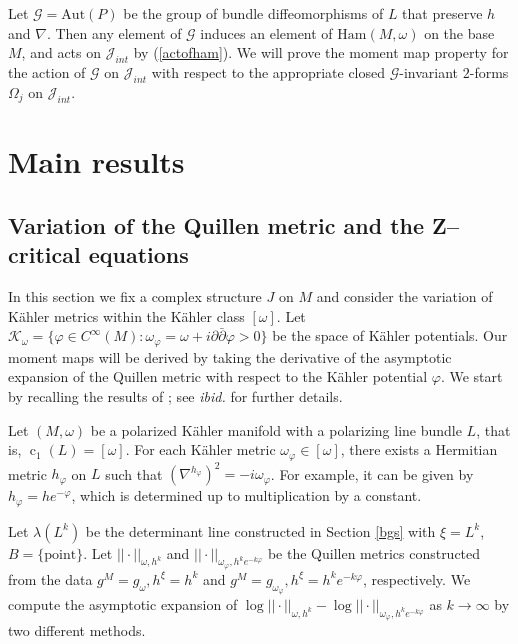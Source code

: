 \documentclass[12pt,reqno,a4paper]{amsart}
\numberwithin{equation}{section}
\DeclareMathOperator{\cc}{c}
\theoremstyle{definition}
\theoremstyle{remark}
\begin{document}
Let $\mathcal{G}=\mathrm{Aut}(P)$ be the group of bundle diffeomorphisms of $L$ that preserve $h$ and $\nabla$. Then any element of $\mathcal{G}$ induces an element of $\mathrm{Ham}(M,\omega)$ on the base $M$, and acts on $\mathcal{J}_{int}$ by (\ref{actofham}). We will prove the moment map property for the action of $\mathcal{G}$ on $\mathcal{J}_{int}$ with respect to the appropriate closed $\mathcal{G}$-invariant $2$-forms $\Omega_j$ on $\mathcal{J}_{int}$. 


\section{Main results}

\subsection{Variation of the Quillen metric and the Z--critical equations}\label{Zcrit}

In this section we fix a complex structure $J$ on $M$ and consider the variation of K\"ahler metrics within the K\"ahler class $[\omega]$. Let $\mathcal{K}_\omega=\{\varphi\in C^\infty(M):\omega_\varphi=\omega+i\partial\bar{\partial}\varphi>0 \}$ be the space of K\"ahler potentials. Our moment maps will be derived by taking the derivative of the asymptotic expansion of the Quillen metric with respect to the K\"ahler potential $\varphi$. We start by recalling the results of \cite{eum2025partition}; see \textit{ibid.} for further details.

Let $(M,\omega)$ be a polarized K\"ahler manifold with a polarizing line bundle $L$, that is, $\cc_1(L)=[\omega]$. For each K\"ahler metric $\omega_\varphi\in [\omega]$, there exists a Hermitian metric $h_\varphi$ on $L$ such that $(\nabla^{h_\varphi})^2=-i\omega_\varphi$. For example, it can be given by $h_\varphi=he^{-\varphi}$, which is determined up to multiplication by a constant.

Let $\lambda(L^k)$ be the determinant line constructed in Section \ref{bgs} with $\xi=L^k$, $B=\{\mathrm{point}\}$. Let $||\cdot||_{\omega,h^k}$ and $||\cdot||_{\omega_\varphi,h^ke^{-k\varphi}}$ be the Quillen metrics constructed from the data $g^M=g_\omega, h^\xi=h^k$ and $g^M=g_{\omega_\varphi}, h^\xi=h^ke^{-k\varphi}$, respectively. We compute the asymptotic expansion of $\log ||\cdot||_{\omega,h^k}-\log ||\cdot||_{\omega_\varphi,h^ke^{-k\varphi}}$ as $k\rightarrow \infty$ by two different methods. 
\end{document}
